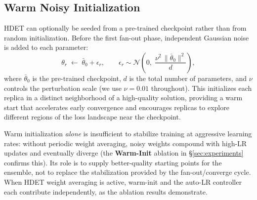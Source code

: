 \documentclass{article}
\begin{document}
\subsection{Warm Noisy Initialization}
\label{sec:warminit}

HDET can optionally be seeded from a pre-trained checkpoint rather than from random
initialization.  Before the first fan-out phase, independent Gaussian noise is added
to each parameter:
\begin{equation}
  \theta_r \;\leftarrow\; \bar\theta_0 + \epsilon_r, \qquad
  \epsilon_r \sim \mathcal{N}\!\left(0,\;\frac{\nu^2\,\|\bar\theta_0\|^2}{d}\right),
  \label{eq:warminit}
\end{equation}
where $\bar\theta_0$ is the pre-trained checkpoint, $d$ is the total number of
parameters, and $\nu$ controls the perturbation scale (we use $\nu{=}0.01$
throughout).  This initializes each replica in a distinct neighborhood of a
high-quality solution, providing a warm start that accelerates early convergence and
encourages replicas to explore different regions of the loss landscape near the
checkpoint.

Warm initialization \emph{alone} is insufficient to stabilize training at aggressive
learning rates: without periodic weight averaging, noisy weights compound with
high-LR updates and eventually diverge (the \textbf{Warm-Init} ablation in
\S\ref{sec:experiments} confirms this).  Its role is to supply better-quality
starting points for the ensemble, not to replace the stabilization provided by the
fan-out/converge cycle.  When HDET weight averaging is active, warm-init and the
auto-LR controller each contribute independently, as the ablation results demonstrate.
\end{document}
